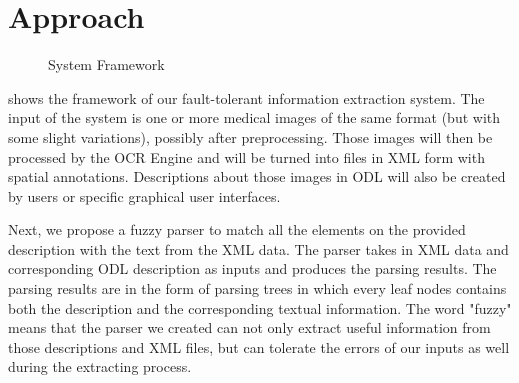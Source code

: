 \section{Approach}
\label{sec:appro}
%

\begin{figure}[th!]
\centering
{}
\caption{System Framework}
\label{fig:frame}
\end{figure}

 shows the framework of our fault-tolerant
information extraction system. The input of the system is
one or more medical images of the same format (but 
with some slight variations), possibly after preprocessing. Those images will then be processed by the OCR Engine and will be turned into files in XML form with spatial annotations. Descriptions about those images in ODL will also be created by users or specific graphical user interfaces.

 
Next, we propose a fuzzy parser to match all the elements on 
the provided description with the text from the XML data. The 
parser takes in XML data and corresponding ODL description as inputs 
and produces the parsing results. The parsing results are in the form of 
parsing trees in which every leaf nodes contains both the description and 
the corresponding textual information.
The word "fuzzy" means that the parser we created can not only extract useful information from those 
descriptions and XML files, but can tolerate the errors of our inputs as well during the extracting process. 


